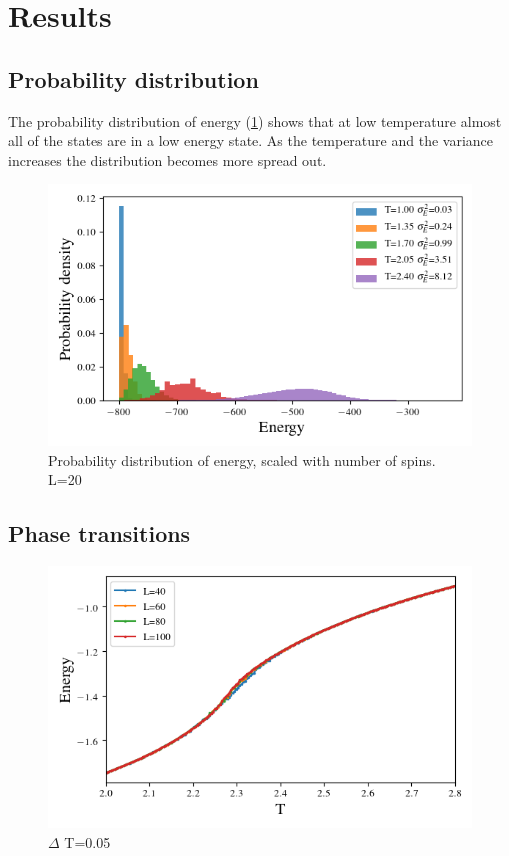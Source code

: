 \section{Results}




\subsection{Probability distribution}

The probability distribution of energy (\cref{fig:distribution}) shows that
at low temperature almost all of the states are in a low energy state.
As the temperature and the variance increases the distribution becomes more
spread out.

\begin{figure}[H]
  \centering
  \includegraphics[width=\textwidth]{../figures/distribution.png}
  \caption{Probability distribution of energy, scaled with number of spins. L=20}
  \label{fig:distribution}
\end{figure}




\subsection{Phase transitions}




\begin{figure}[H]
  \centering
  \includegraphics[width=\textwidth]{../figures/phase_E.png}
  \caption{$\Delta$ T=0.05}
  \label{fig:phase_E}
\end{figure}

